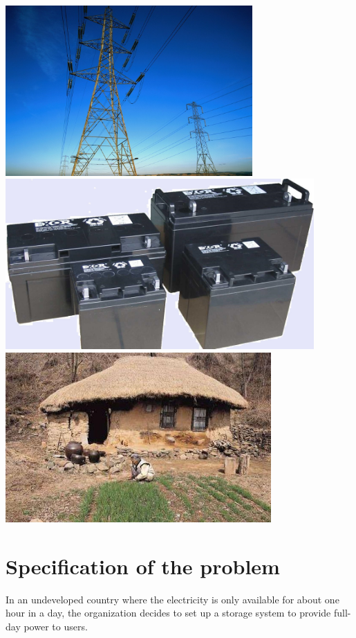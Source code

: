 \documentclass[a0,portrait]{a0poster}
\begin{document}
\begin{multicols}{2}
\begin{itemize}
\end{itemize}

\includegraphics[height=6.5cm]{line.jpg} \
\includegraphics[height=6.5cm]{battery.jpg}\
\includegraphics[height=6.5cm]{undev.jpg}\\

\section*{Specification of the problem}

In an undeveloped country where the electricity is only available for about one hour in a day, the organization decides to set up a storage system to provide full-day power to users.


\end{multicols}
\end{document}
